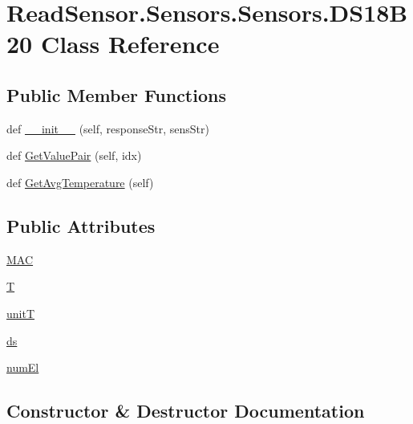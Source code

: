 \hypertarget{classReadSensor_1_1Sensors_1_1Sensors_1_1DS18B20}{}\section{Read\+Sensor.\+Sensors.\+Sensors.\+D\+S18\+B20 Class Reference}
\label{classReadSensor_1_1Sensors_1_1Sensors_1_1DS18B20}
\subsection*{Public Member Functions}
\begin{DoxyCompactItemize}
\item 
def \hyperlink{classReadSensor_1_1Sensors_1_1Sensors_1_1DS18B20_abd12b07478d8d6700391b478e5dc6743}{\+\_\+\+\_\+init\+\_\+\+\_\+} (self, response\+Str, sens\+Str)
\item 
def \hyperlink{classReadSensor_1_1Sensors_1_1Sensors_1_1DS18B20_a3de3ef1d70ebd46ed47fedf147aa2af9}{Get\+Value\+Pair} (self, idx)
\item 
def \hyperlink{classReadSensor_1_1Sensors_1_1Sensors_1_1DS18B20_af67413d1aaeddd08769e8720f6d55cdb}{Get\+Avg\+Temperature} (self)
\end{DoxyCompactItemize}
\subsection*{Public Attributes}
\begin{DoxyCompactItemize}
\item 
\hyperlink{classReadSensor_1_1Sensors_1_1Sensors_1_1DS18B20_a586ce8e71cef560e2a1a8f2461abe3f1}{M\+AC}
\item 
\hyperlink{classReadSensor_1_1Sensors_1_1Sensors_1_1DS18B20_ac16de12d6071752c317827bdcb2b9462}{T}
\item 
\hyperlink{classReadSensor_1_1Sensors_1_1Sensors_1_1DS18B20_a6e755c7e5e31b296e06e1825b6b53616}{unitT}
\item 
\hyperlink{classReadSensor_1_1Sensors_1_1Sensors_1_1DS18B20_a261fd85fee68a5b59104c0b91462283c}{ds}
\item 
\hyperlink{classReadSensor_1_1Sensors_1_1Sensors_1_1DS18B20_a84998684fc37c7c7c2ec2bdf07bcdbc3}{num\+El}
\end{DoxyCompactItemize}


\subsection{Constructor \& Destructor Documentation}
